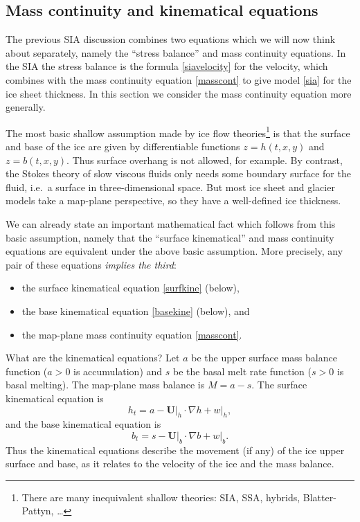 \documentclass[titlepage,a4paper,final,12pt]{scrartcl}
\newcommand{\grad}{\nabla}
\begin{document}
\subsection{Mass continuity and kinematical equations}

The previous SIA discussion combines two equations which we will now think about separately, namely the ``stress balance'' and mass continuity equations.  In the SIA the stress balance is the formula \eqref{siavelocity} for the velocity, which combines with the mass continuity equation \eqref{masscont} to give model \eqref{sia} for the ice sheet thickness.  In this section we consider the mass continuity equation more generally.

The most basic shallow assumption made by ice flow theories\footnote{There are many inequivalent shallow theories: SIA, SSA, hybrids, Blatter-Pattyn, \dots} is that the surface and base of the ice are given by differentiable functions $z=h(t,x,y)$ and $z=b(t,x,y)$.  Thus surface overhang is not allowed, for example.  By contrast, the Stokes theory of slow viscous fluids only needs some boundary surface for the fluid, i.e.~a surface in three-dimensional space.  But most ice sheet and glacier models take a map-plane perspective, so they have a well-defined ice thickness.

We can already state an important mathematical fact which follows from this basic assumption, namely that the ``surface kinematical'' and mass continuity equations are equivalent under the above basic assumption.  More precisely, any pair of these equations \emph{implies the third}:
  \begin{itemize}
  \item the surface kinematical equation \eqref{surfkine} (below),
  \item the base kinematical equation \eqref{basekine} (below), and
  \item the map-plane mass continuity equation \eqref{masscont}.
  \end{itemize}

What are the kinematical equations?  Let $a$ be the upper surface mass balance function ($a>0$ is accumulation) and $s$ be the basal melt rate function ($s>0$ is basal melting).  The map-plane mass balance is $M=a-s$.  The surface kinematical equation is 
\begin{equation}
h_t = a - \mathbf{U}\big|_h \cdot \grad h + w\big|_h,  \label{surfkine}
\end{equation}
and the base kinematical equation is
\begin{equation}
b_t = s - \mathbf{U}\big|_b \cdot \grad b + w\big|_b.  \label{basekine}
\end{equation}
Thus the kinematical equations describe the movement (if any) of the ice upper surface and base, as it relates to the velocity of the ice and the mass balance.
\end{document}
